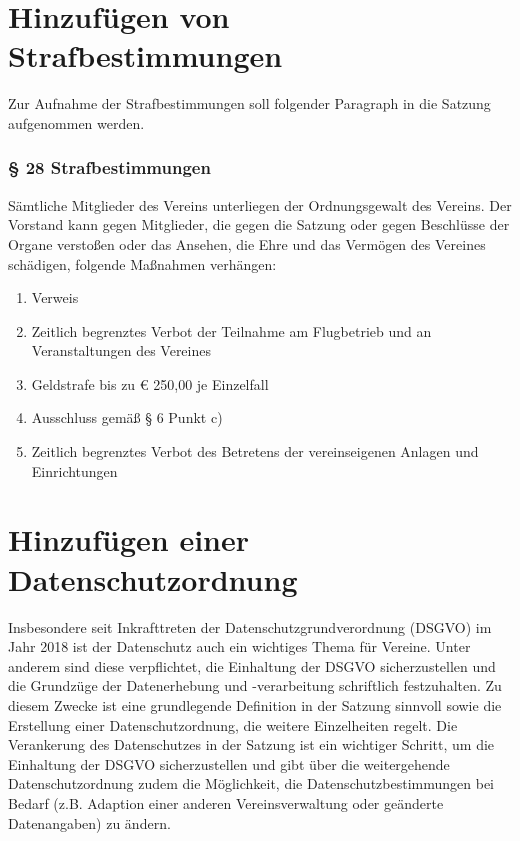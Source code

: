 \documentclass[10pt,a4paper,parskip=half]{scrartcl}
\newcommand{\change}[1]{
  \begin{adjustwidth}{20pt}{20pt}
    #1
  \end{adjustwidth}
}
\begin{document}
  \section{Hinzufügen von Strafbestimmungen}

  Zur Aufnahme der Strafbestimmungen soll folgender Paragraph in die Satzung aufgenommen werden.

  \change{
    \subsubsection*{§ 28 Strafbestimmungen}
    Sämtliche Mitglieder des Vereins unterliegen der Ordnungsgewalt des Vereins.
    Der Vorstand kann gegen Mitglieder,
    die gegen die Satzung oder gegen Beschlüsse der Organe verstoßen oder das Ansehen,
    die Ehre und das Vermögen des Vereines schädigen,
    folgende Maßnahmen verhängen:
    \begin{enumerate}[label=\alph*),noitemsep]
      \item Verweis
      \item Zeitlich begrenztes Verbot der Teilnahme am Flugbetrieb und an Veranstaltungen des Vereines
      \item Geldstrafe bis zu € 250,00 je Einzelfall
      \item Ausschluss gemäß § 6 Punkt c)
      \item Zeitlich begrenztes Verbot des Betretens der vereinseigenen Anlagen und Einrichtungen
    \end{enumerate}
  }

  \section{Hinzufügen einer Datenschutzordnung}
  Insbesondere seit Inkrafttreten der Datenschutzgrundverordnung (DSGVO) im Jahr 2018 ist der Datenschutz auch ein wichtiges Thema für Vereine. Unter anderem sind diese verpflichtet, die Einhaltung der DSGVO sicherzustellen und die Grundzüge der Datenerhebung und -verarbeitung schriftlich festzuhalten. Zu diesem Zwecke ist eine grundlegende Definition in der Satzung sinnvoll sowie die Erstellung einer Datenschutzordnung, die weitere Einzelheiten regelt. Die Verankerung des Datenschutzes in der Satzung ist ein wichtiger Schritt,  um die Einhaltung der DSGVO sicherzustellen und gibt über die weitergehende Datenschutzordnung zudem die Möglichkeit, die Datenschutzbestimmungen bei Bedarf (z.B. Adaption einer anderen Vereinsverwaltung oder geänderte Datenangaben) zu ändern.
\end{document}
